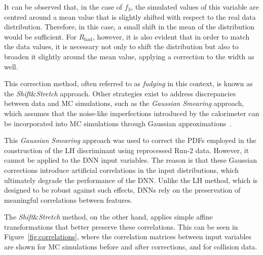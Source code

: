 It can be observed that, in the case of $f_3$, the simulated values of this variable are centred around a mean value that is slightly shifted with respect to the real data distribution. Therefore, in this case, a small shift in the mean of the distribution would be sufficient. 
For $R_{\text{had}}$, however, it is also evident that in order to match the data values, it is necessary not only to shift the distribution but also to broaden it slightly around the mean value, applying a correction to the width as well.

This correction method, often referred to as \textit{fudging} in this context, is known as the \textit{Shift}$\&$\textit{Stretch} approach. Other strategies exist to address discrepancies between data and MC simulations, such as the \textit{Gaussian Smearing} approach, which assumes that the noise-like imperfections introduced by the calorimeter can be incorporated into MC simulations through Gaussian approximations~\cite{Puddefoot:2797826}.

This \textit{Gaussian Smearing} approach was used to correct the PDFs employed in the construction of the LH discriminant using reprocessed Run-2 data. However, it cannot be applied to the DNN input variables. The reason is that these Gaussian corrections introduce artificial correlations in the input distributions, which ultimately degrade the performance of the DNN. Unlike the LH method, which is designed to be robust against such effects, DNNs rely on the preservation of meaningful correlations between features.

The \textit{Shift}$\&$\textit{Stretch} method, on the other hand, applies simple affine transformations that better preserve these correlations. This can be seen in Figure~\ref{fig:correlations}, where the correlation matrices between input variables are shown for MC simulations before and after corrections, and for collision data.

